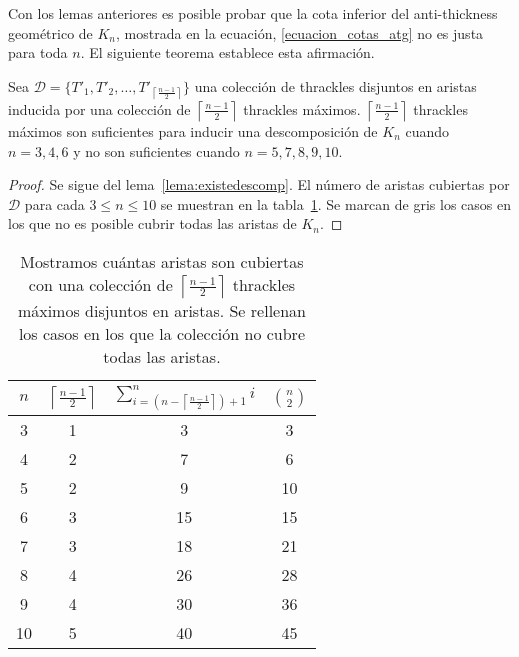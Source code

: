 Con los lemas anteriores es posible probar que la cota inferior del
anti-thickness geométrico de $K_n$, mostrada en la ecuación,
\ref{ecuacion_cotas_atg} no es justa para toda $n$. El siguiente teorema
establece esta afirmación.
\begin{theorem}\label{teo:cotainf}
Sea $\mathcal{D}=\{T'_1,T'_2,\dots,T'_{\left\lceil\frac{n-1}{2}\right\rceil}\}$
una colección de thrackles disjuntos en aristas inducida por una colección de
$\left\lceil\frac{n-1}{2}\right\rceil$ thrackles máximos.
$\left\lceil\frac{n-1}{2}\right\rceil$ thrackles máximos son
suficientes para inducir una descomposición de $K_n$ cuando $n={3,4,6}$ y no son suficientes cuando $n={5,7,8,9,10}$.
\end{theorem}
\begin{proof}
  Se sigue del lema~\ref{lema:existedescomp}. El número de aristas cubiertas
  por $\mathcal{D}$ para cada $3\leq n \leq 10$ se muestran en la
  tabla~\ref{table:attrivialtight}. Se marcan de gris los casos en los que no es
  posible cubrir todas las aristas de $K_n$.
\end{proof}

\begin{table}[t]
  \centering
  \begin{tabular}{|c|c|c|c|}
    \hline
    $n$ & $\left\lceil\frac{n-1}{2}\right\rceil$ &
    $\sum^n_{i=\left(n-\left\lceil\frac{n-1}{2}\right\rceil\right) + 1}i$ &
    $\binom{n}{2}$\\[5pt] \hline\hline
    3   & 1  & 3 & 3 \\ \hline
    4   & 2  & 7 & 6 \\ \hline
    5   & 2  & \cellcolor{red!25}9 & 10 \\ \hline
    6   & 3  & 15 & 15 \\ \hline
    7   & 3  & \cellcolor{red!25}18 & 21 \\ \hline
    8   & 4  & \cellcolor{red!25}26 & 28 \\ \hline
    9   & 4  & \cellcolor{red!25}30 & 36 \\ \hline
    10  & 5  & \cellcolor{red!25}40 & 45 \\ \hline
  \end{tabular}
  \caption{ Mostramos cuántas aristas son cubiertas con una colección de
  $\left\lceil\frac{n-1}{2}\right\rceil$ thrackles máximos disjuntos en
  aristas. Se rellenan los casos en los que la colección no cubre todas las
  aristas. }
  \label{table:attrivialtight}
\end{table}

